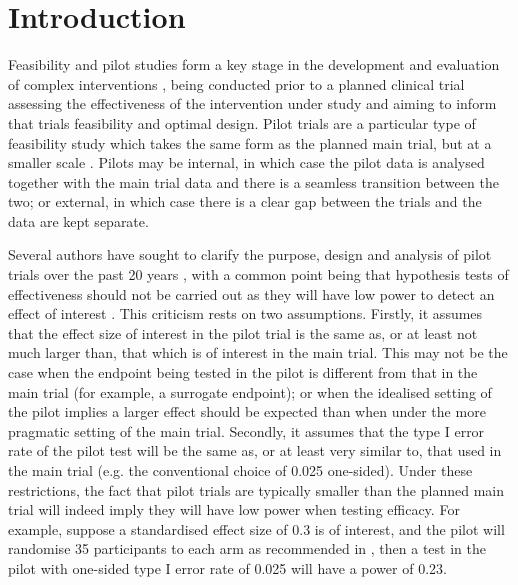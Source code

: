 \documentclass[sagev]{sagej}
\begin{document}

\maketitle

\section{Introduction}

Feasibility and pilot studies form a key stage in the development and evaluation of complex interventions \cite{Craig2008}, being conducted prior to a planned clinical trial assessing the effectiveness of the intervention under study and aiming to inform that trials feasibility and optimal design. Pilot trials are a particular type of feasibility study which takes the same form as the planned main trial, but at a smaller scale \cite{Eldridge2016}. Pilots may be internal, in which case the pilot data is analysed together with the main trial data and there is a seamless transition between the two; or external, in which case there is a clear gap between the trials and the data are kept separate.

Several authors have sought to clarify the purpose, design and analysis of pilot trials over the past 20 years \cite{Lancaster2004}, with a common point being that hypothesis tests of effectiveness should not be carried out as they will have low power to detect an effect of interest \cite{Wilson2015}. This criticism rests on two assumptions. Firstly, it assumes that the effect size of interest in the pilot trial is the same as, or at least not much larger than, that which is of interest in the main trial. This may not be the case when the endpoint being tested in the pilot is different from that in the main trial (for example, a surrogate endpoint); or when the idealised setting of the pilot implies a larger effect should be expected than when under the more pragmatic setting of the main trial. Secondly, it assumes that the type I error rate of the pilot test will be the same as, or at least very similar to, that used in the main trial (e.g. the conventional choice of 0.025 one-sided). Under these restrictions, the fact that pilot trials are typically smaller than the planned main trial will indeed imply they will have low power when testing efficacy. For example, suppose a standardised effect size of 0.3 is of interest, and the pilot will randomise 35 participants to each arm as recommended in \cite{Teare2014}, then a test in the pilot with one-sided type I error rate of 0.025 will have a power of 0.23.
\end{document}
